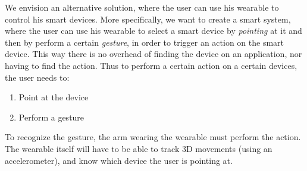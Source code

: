 We envision an alternative solution, 
where the user can use his wearable to control his smart devices. 
More specifically, we want to create a smart system, 
where the user can use his wearable to select a smart device by \emph{pointing} at it
and then by perform a certain \emph{gesture}, in order to trigger an action on the smart device.
This way there is no overhead of finding the device on an application, 
nor having to find the action. 
Thus to perform a certain action on a certain devices, the user needs to:
\begin{enumerate}
  \item Point at the device
  \item Perform a gesture
\end{enumerate}

To recognize the gesture, the arm wearing the wearable must perform the action. 
The wearable itself will have to be able to track 3D movements (using \eg an accelerometer), 
and know which device the user is pointing at. 



%
